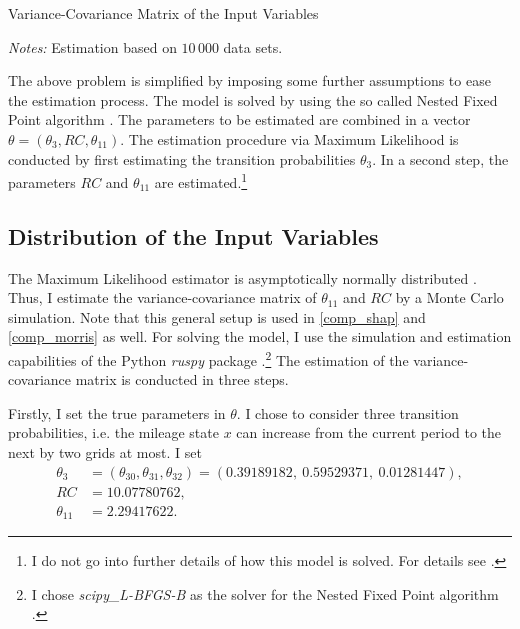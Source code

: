 \begin{table}
	\centering
	\caption{Variance-Covariance Matrix of the Input Variables}
	\label{cov}
	\begin{threeparttable}
	\centering
	
	\begin{tablenotes}
	\small
	\item \textit{Notes:} Estimation based on $10\,000$ data sets.
	\end{tablenotes}
	\end{threeparttable}
\end{table}

The above problem is simplified by imposing some further assumptions to ease the estimation process. The model is solved by using the so called Nested Fixed Point algorithm \citep{R87}. The parameters to be estimated are combined in a vector $\theta=(\theta_3, RC, \theta_{11}) $. The estimation procedure via Maximum Likelihood is conducted by first estimating the transition probabilities $\theta_3$. In a second step, the parameters $RC$ and $\theta_{11}$ are estimated.\footnote{I do not go into further details of how this model is solved. For details see \citet{R87}.}

\subsection{Distribution of the Input Variables} \label{model_setup}

The Maximum Likelihood estimator is asymptotically normally distributed \citep{R73}. Thus, I estimate the variance-covariance matrix of $\theta_{11}$ and $RC$ by a Monte Carlo simulation. Note that this general setup is used in \cref{comp_shap} and \cref{comp_morris} as well. For solving the model, I use the simulation and estimation capabilities of the Python \textit{ruspy} package \citep{OSE19}.\footnote{I chose \textit{scipy\_L-BFGS-B} as the solver for the Nested Fixed Point algorithm \citep{SP20}.} The estimation of the variance-covariance matrix is conducted in three steps.

Firstly, I set the true parameters in $\theta$. I chose to consider three transition probabilities, i.e. the mileage state $x$ can increase from the current period to the next by two grids at most. I set
\begin{align*}
\theta_3 &= (\theta_{30}, \theta_{31}, \theta_{32})=(0.39189182,\ 0.59529371,\ 0.01281447),\\
RC &= 10.07780762,\\
\theta_{11} &= 2.29417622.
\end{align*}

